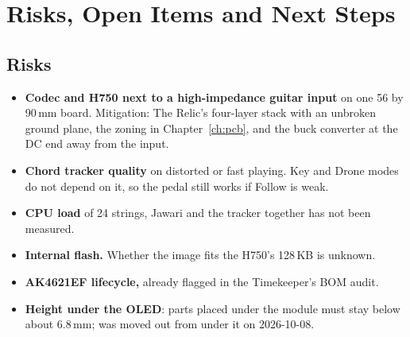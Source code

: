 \chapter{Risks, Open Items and Next Steps}\label{ch:risks}

\section{Risks}
\begin{itemize}
  \item \textbf{Codec and H750 next to a high-impedance guitar input} on one 56 by 90\,mm board. Mitigation: The Relic's four-layer stack with an unbroken ground plane, the zoning in Chapter~\ref{ch:pcb}, and the buck converter at the DC end away from the input.
  \item \textbf{Chord tracker quality} on distorted or fast playing. Key and Drone modes do not depend on it, so the pedal still works if Follow is weak.
  \item \textbf{CPU load} of 24 strings, Jawari and the tracker together has not been measured.
  \item \textbf{Internal flash.} Whether the image fits the H750's 128\,KB is unknown.
  \item \textbf{AK4621EF lifecycle,} already flagged in the Timekeeper's BOM audit.
  \item \textbf{Height under the OLED}: parts placed under the module must stay below about 6.8\,mm;  was moved out from under it on 2026-10-08.
\end{itemize}

